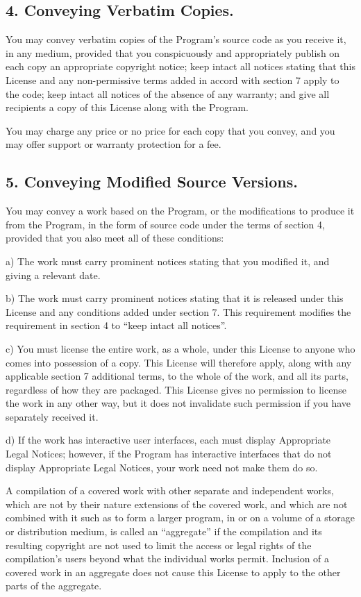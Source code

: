 \documentclass[letterpaper,10pt,english]{sphinxmanual}
\begin{document}
\subsection{4. Conveying Verbatim Copies.}
\label{license:conveying-verbatim-copies}
You may convey verbatim copies of the Program's source code as you
receive it, in any medium, provided that you conspicuously and
appropriately publish on each copy an appropriate copyright notice;
keep intact all notices stating that this License and any
non-permissive terms added in accord with section 7 apply to the code;
keep intact all notices of the absence of any warranty; and give all
recipients a copy of this License along with the Program.

You may charge any price or no price for each copy that you convey,
and you may offer support or warranty protection for a fee.


\subsection{5. Conveying Modified Source Versions.}
\label{license:conveying-modified-source-versions}
You may convey a work based on the Program, or the modifications to
produce it from the Program, in the form of source code under the
terms of section 4, provided that you also meet all of these conditions:

a) The work must carry prominent notices stating that you modified
it, and giving a relevant date.

b) The work must carry prominent notices stating that it is
released under this License and any conditions added under section
7.  This requirement modifies the requirement in section 4 to
``keep intact all notices''.

c) You must license the entire work, as a whole, under this
License to anyone who comes into possession of a copy.  This
License will therefore apply, along with any applicable section 7
additional terms, to the whole of the work, and all its parts,
regardless of how they are packaged.  This License gives no
permission to license the work in any other way, but it does not
invalidate such permission if you have separately received it.

d) If the work has interactive user interfaces, each must display
Appropriate Legal Notices; however, if the Program has interactive
interfaces that do not display Appropriate Legal Notices, your
work need not make them do so.

A compilation of a covered work with other separate and independent
works, which are not by their nature extensions of the covered work,
and which are not combined with it such as to form a larger program,
in or on a volume of a storage or distribution medium, is called an
``aggregate'' if the compilation and its resulting copyright are not
used to limit the access or legal rights of the compilation's users
beyond what the individual works permit.  Inclusion of a covered work
in an aggregate does not cause this License to apply to the other
parts of the aggregate.
\end{document}
